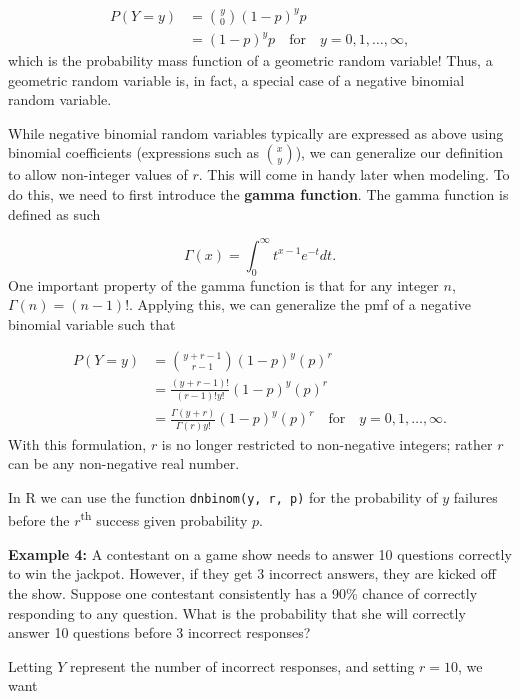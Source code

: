 \documentclass[
]{krantz}
\begin{document}
\begin{align*}
 P(Y=y) &= \binom{y}{0} (1-p)^yp \\
        &= (1-p)^yp \quad \textrm{for} \quad y = 0, 1, \ldots, \infty,
\end{align*}
which is the probability mass function of a geometric random variable! Thus, a geometric random variable is, in fact, a special case of a negative binomial random variable.

While negative binomial random variables typically are expressed as above using binomial coefficients (expressions such as \(\binom{x}{y}\)), we can generalize our definition to allow non-integer values of \(r\). This will come in handy later when modeling. To do this, we need to first introduce the \textbf{gamma function}.  The gamma function is defined as such

\begin{equation}
\Gamma(x)  = \int_0^\infty t^{x-1} e^{-t}dt.
\label{eq:gammaFun}
\end{equation}
One important property of the gamma function is that for any integer \(n\), \(\Gamma(n) = (n-1)!\). Applying this, we can generalize the pmf of a negative binomial variable such that

\begin{align*}
 P(Y=y) &= \binom{y + r - 1}{r-1}           (1-p)^{y}(p)^r \\
        &= \frac{(y+r-1)!}{(r-1)!y!}         (1-p)^{y}(p)^r \\
        &= \frac{\Gamma(y+r)}{\Gamma(r) y!}  (1-p)^{y}(p)^r \quad \textrm{for} \quad y = 0, 1, \ldots, \infty.
\end{align*}
With this formulation, \(r\) is no longer restricted to non-negative integers; rather \(r\) can be any non-negative real number.

In R we can use the function \texttt{dnbinom(y,\ r,\ p)} for the probability of \(y\) failures before the \(r\)\textsuperscript{th} success given probability \(p\).

\textbf{Example 4:} A contestant on a game show needs to answer 10 questions correctly to win the jackpot. However, if they get 3 incorrect answers, they are kicked off the show. Suppose one contestant consistently has a 90\% chance of correctly responding to any question. What is the probability that she will correctly answer 10 questions before 3 incorrect responses?

Letting \(Y\) represent the number of incorrect responses, and setting \(r = 10\), we want
\end{document}
